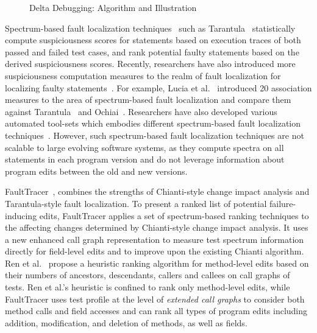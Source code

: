 \begin{figure}
\begin{minipage}{.48\textwidth}
\end{minipage}
\caption{Delta Debugging: Algorithm and Illustration} 
\label{fig:deltadebugging} 
\end{figure}


Spectrum-based fault localization techniques~\cite{hao2005similarity,Hao:com09,harrold05tarantula,Abreu:testing07,Baudry:icse06,liblit05,Yanbing:icse08, abreu2009practical} such as Tarantula~\cite{Jones2002:tarantula} statistically compute suspiciousness scores for statements based on execution traces of both passed and failed test cases, and rank potential faulty statements based on the derived suspiciousness scores. Recently, researchers have also introduced more suspiciousness computation measures to the realm of fault localization for localizing faulty statements~\cite{naish2011model, lo2010comprehensive}. For example, Lucia et al.~\cite{lo2010comprehensive} introduced 20 association measures to the area of spectrum-based fault localization and compare them against Tarantula~\cite{Jones2002:tarantula} and Ochiai~\cite{Abreu:testing07}. Researchers have also developed various automated tool-sets which embodies different spectrum-based fault localization techniques~\cite{tarantula-url, janssen2009zoltar}. However, such spectrum-based fault localization techniques are not scalable to large evolving software systems, as they compute spectra on all statements in each program version and do not leverage information about program edits between the old and new versions.

FaultTracer~\cite{zhang2011localizing}, combines the strengths of Chianti-style change impact analysis and Tarantula-style fault localization. To present a ranked list of potential failure-inducing edits, FaultTracer applies a set of spectrum-based ranking techniques to the affecting changes determined by Chianti-style change impact analysis. It uses a new enhanced call graph representation to measure test spectrum information directly for field-level edits and to improve upon the existing Chianti algorithm. Ren et al.~\cite{Ren2007} propose a heuristic ranking algorithm for method-level edits based on their numbers of ancestors, descendants, callers and callees on call graphs of tests. Ren et al.'s heuristic is confined to rank only method-level edits, while FaultTracer uses test profile at the level of {\em extended call graphs} to consider both method calls and field accesses and can rank all types of program edits including addition, modification, and deletion of methods, as well as fields.  

